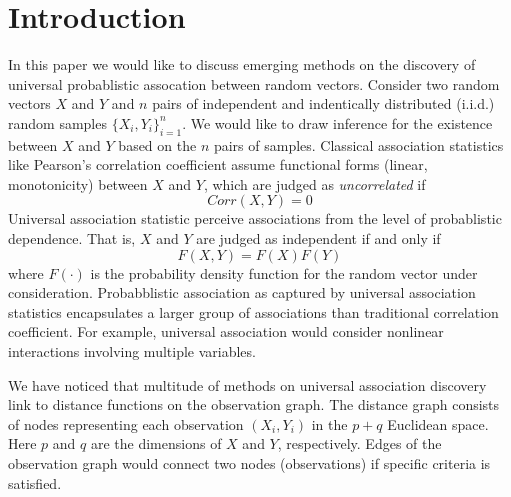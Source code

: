 \documentclass{sig-alternate}
\begin{document}


\section{Introduction}
\label{sec:intro}

In this paper we would like to discuss emerging methods on the
discovery of universal probablistic assocation between random vectors.
Consider two random vectors $X$ and $Y$ and $n$ pairs of independent
and indentically distributed (i.i.d.) random samples $\{X_i,
Y_i\}_{i=1}^n$. We would like to draw inference for the existence
between $X$ and $Y$ based on the $n$ pairs of samples. Classical
association statistics like Pearson's correlation coefficient assume
functional forms (linear, monotonicity) between $X$ and $Y$, which are
judged as \emph{uncorrelated} if
\begin{displaymath}
  Corr(X,Y)=0
\end{displaymath}
Universal association statistic perceive associations from the level
of probablistic dependence. That is, $X$ and $Y$ are judged as
independent if and only if
\begin{equation}
  \label{eq:independence}
  F(X,Y)= F(X) F(Y)
\end{equation}
where $F(\cdot)$ is the probability density function for the random
vector under consideration. Probabblistic association as captured by
universal association statistics encapsulates a larger group of
associations than traditional correlation coefficient. For example,
universal association would consider nonlinear interactions involving
multiple variables. 

We have noticed that multitude of methods on universal association
discovery link to distance functions on the observation graph. The
distance graph consists of nodes representing each observation $(X_i,
Y_i)$ in the $p+q$ Euclidean space. Here $p$ and $q$ are the
dimensions of $X$ and $Y$, respectively. Edges of the observation
graph would connect two nodes (observations) if specific criteria is
satisfied.
\end{document}
